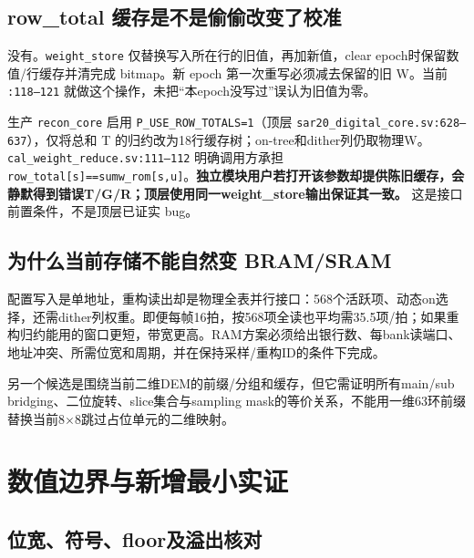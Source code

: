 \documentclass[UTF8,fontset=fandol,10pt,a4paper,openany]{ctexrep}
\newcommand{\code}[1]{\nolinkurl{#1}}
\begin{document}
\subsection{row\_total 缓存是不是偷偷改变了校准}


没有。\code{weight_store} 仅替换写入所在行的旧值，再加新值，clear epoch时保留数值/行缓存并清完成 bitmap。新 epoch 第一次重写必须减去保留的旧 W。当前 \code{:118–121} 就做这个操作，未把“本epoch没写过”误认为旧值为零。


生产 \code{recon_core} 启用 \code{P_USE_ROW_TOTALS=1}（顶层 \code{sar20_digital_core.sv:628–637}），仅将总和 T 的归约改为18行缓存树；on-tree和dither列仍取物理W。\code{cal_weight_reduce.sv:111–112} 明确调用方承担 \code{row_total[s]==sumw_rom[s,u]}。\textbf{独立模块用户若打开该参数却提供陈旧缓存，会静默得到错误T/G/R；顶层使用同一weight\_store输出保证其一致。} 这是接口前置条件，不是顶层已证实 bug。


\subsection{为什么当前存储不能自然变 BRAM/SRAM}


配置写入是单地址，重构读出却是物理全表并行接口：568个活跃项、动态on选择，还需dither列权重。即便每帧16拍，按568项全读也平均需35.5项/拍；如果重构归约能用的窗口更短，带宽更高。RAM方案必须给出银行数、每bank读端口、地址冲突、所需位宽和周期，并在保持采样/重构ID的条件下完成。


另一个候选是围绕当前二维DEM的前缀/分组和缓存，但它需证明所有main/sub bridging、二位旋转、slice集合与sampling mask的等价关系，不能用一维63环前缀替换当前8\ensuremath{\times}8跳过占位单元的二维映射。


\section{数值边界与新增最小实证}


\subsection{位宽、符号、floor及溢出核对}
\end{document}
